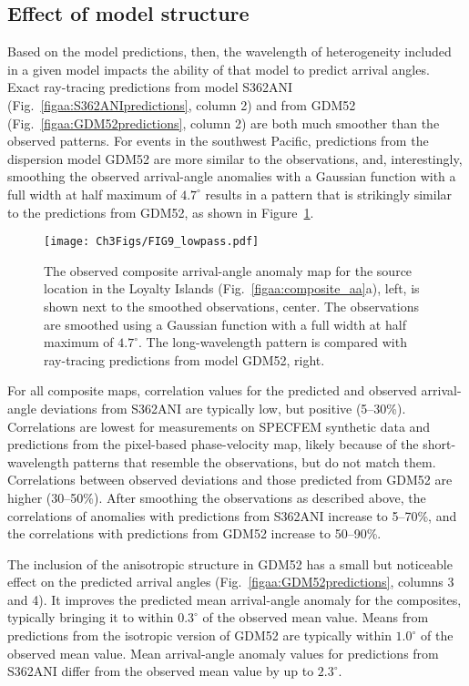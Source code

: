 \documentclass[12pt,oneside]{book}
\newcommand{\degree}[1]{\mbox{$#1^{\circ}$}}
\begin{document}
\subsection{Effect of model structure}\label{secaa:effectofmodelstructure}
Based on the model predictions, then, the wavelength of heterogeneity included in a given model impacts the ability of that model to predict arrival angles. Exact ray-tracing predictions from model S362ANI (Fig.~\ref{figaa:S362ANIpredictions}, column 2) and from GDM52 (Fig.~\ref{figaa:GDM52predictions}, column 2) are both much smoother than the observed patterns. For events in the southwest Pacific, predictions from the dispersion model GDM52 are more similar to the observations, and, interestingly, smoothing the observed arrival-angle anomalies with a Gaussian function with a full width at half maximum of \degree{4.7} results in a pattern that is strikingly similar to the predictions from GDM52, as shown in Figure~\ref{figaa:lowpass}. 

\begin{figure} 
\begin{center}
\texttt{[image: Ch3Figs/FIG9\_lowpass.pdf]} 
\caption[Long-wavelength arrival-angle anomaly pattern]{The observed composite arrival-angle anomaly map for the source location in the Loyalty Islands (Fig.~\ref{figaa:composite_aa}a), left, is shown next to the smoothed observations, center. The observations are smoothed using a Gaussian function with a full width at half maximum of \degree{4.7}. The long-wavelength pattern is compared with ray-tracing predictions from model GDM52, right. }
\label{figaa:lowpass}
\end{center}
\end{figure}
%

For all composite maps, correlation values for the predicted and observed arrival-angle deviations from S362ANI are typically low, but positive (5--30\%). Correlations are lowest for measurements on SPECFEM synthetic data and predictions from the pixel-based phase-velocity map, likely because of the short-wavelength patterns that resemble the observations, but do not match them. Correlations between observed deviations and those predicted from GDM52 are higher (30--50\%). After smoothing the observations as described above, the correlations of anomalies with predictions from S362ANI increase to 5--70\%, and the correlations with predictions from GDM52 increase to 50--90\%.

The inclusion of the anisotropic structure in GDM52 has a small but noticeable effect on the predicted arrival angles (Fig.~\ref{figaa:GDM52predictions}, columns 3 and 4). It improves the predicted mean arrival-angle anomaly for the composites, typically bringing it to within \degree{0.3} of the observed mean value. Means from predictions from the isotropic version of GDM52 are typically within \degree{1.0} of the observed mean value. Mean arrival-angle anomaly values for predictions from S362ANI differ from the observed mean value by up to \degree{2.3}. 
\end{document}
